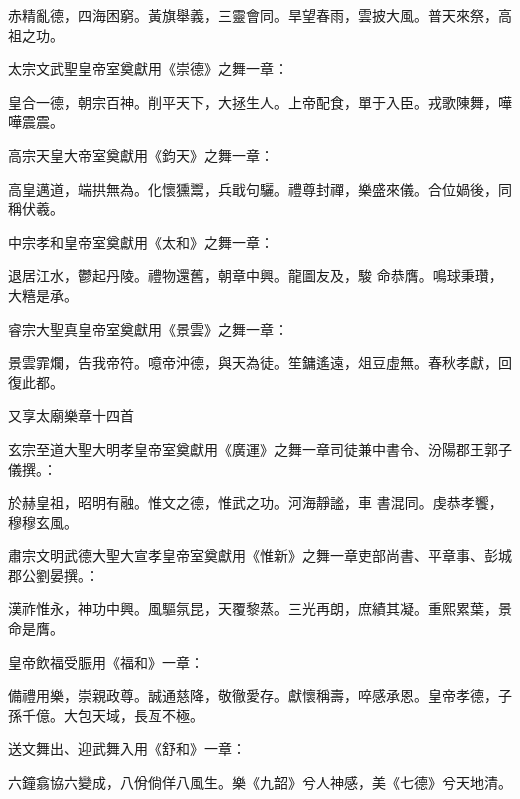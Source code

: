 \begin{pinyinscope}
 赤精亂德，四海困窮。黃旗舉義，三靈會同。旱望春雨，雲披大風。普天來祭，高祖之功。



 太宗文武聖皇帝室奠獻用《崇德》之舞一章：



 皇合一德，朝宗百神。削平天下，大拯生人。上帝配食，單于入臣。戎歌陳舞，嘩嘩震震。



 高宗天皇大帝室奠獻用《鈞天》之舞一章：



 高皇邁道，端拱無為。化懷獯鬻，兵戢句驪。禮尊封禪，樂盛來儀。合位媧後，同稱伏羲。



 中宗孝和皇帝室奠獻用《太和》之舞一章：



 退居江水，鬱起丹陵。禮物還舊，朝章中興。龍圖友及，駿
 命恭膺。鳴球秉瓚，大糦是承。



 睿宗大聖真皇帝室奠獻用《景雲》之舞一章：



 景雲霏爛，告我帝符。噫帝沖德，與天為徒。笙鏞遙遠，俎豆虛無。春秋孝獻，回復此都。



 又享太廟樂章十四首



 玄宗至道大聖大明孝皇帝室奠獻用《廣運》之舞一章司徒兼中書令、汾陽郡王郭子儀撰。：



 於赫皇祖，昭明有融。惟文之德，惟武之功。河海靜謐，車
 書混同。虔恭孝饗，穆穆玄風。



 肅宗文明武德大聖大宣孝皇帝室奠獻用《惟新》之舞一章吏部尚書、平章事、彭城郡公劉晏撰。：



 漢祚惟永，神功中興。風驅氛昆，天覆黎蒸。三光再朗，庶績其凝。重熙累葉，景命是膺。



 皇帝飲福受脤用《福和》一章：



 備禮用樂，崇親政尊。誠通慈降，敬徹愛存。獻懷稱壽，啐感承恩。皇帝孝德，子孫千億。大包天域，長亙不極。



 送文舞出、迎武舞入用《舒和》一章：



 六鐘翕協六變成，八佾倘佯八風生。樂《九韶》兮人神感，美《七德》兮天地清。




\end{pinyinscope}
